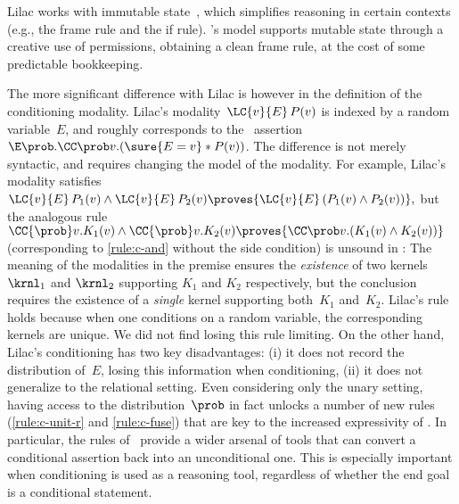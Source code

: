 \documentclass[acmsmall,nonacm,screen,appendix]{acmart}
\begin{document}
Lilac works with
immutable state~\cite{staton2020},
which simplifies reasoning in certain contexts
(e.g., the frame rule and the if rule).
\thelogic's model supports mutable state through a creative use of permissions,
obtaining a clean frame rule, at the cost of some predictable bookkeeping.

The more significant difference with Lilac is however in the definition of the conditioning modality.
Lilac's modality~$\LC{v}{E}\,P(v)$ is indexed by a random variable~$E$,
and roughly corresponds to the \thelogic\ assertion
$ \E \prob. \CC \prob v.(\sure{E=v} * P(v)) $.
The difference is not merely syntactic,
and requires changing the model of the modality.
For example, Lilac's modality satisfies
$
  {\LC{v}{E}\,P_1(v) \land \LC{v}{E}\,P_2(v)}
  \proves
  {\LC{v}{E}\,(P_1(v) \land P_2(v))},
$
but the analogous rule
$
  {\CC{\prob} v. K_1(v)
    \land
  \CC{\prob} v. K_2(v)}
  \proves
  {\CC\prob v.
    (K_1(v) \land K_2(v))}
$
(corresponding to \ref{rule:c-and} without the side condition)
is unsound in \thelogic:
The meaning of the modalities in the premise ensures
the \emph{existence} of two kernels $\krnl_1$ and $\krnl_2$ supporting
$K_1$ and $K_2$ respectively,
but the conclusion requires the existence of a \emph{single} kernel
supporting both~$K_1$ and~$K_2$.
Lilac's rule holds because when one conditions on a random variable,
the corresponding kernels are unique.
We did not find losing this rule limiting.
On the other hand,
Lilac's conditioning has two key disadvantages:
(i)  it does not record the distribution of~$E$,
     losing this information when conditioning,
(ii) it does not generalize to the relational setting.
Even considering only the unary setting,
having access to the distribution~$\prob$ in fact unlocks a number of new
rules (\eg \ref{rule:c-unit-r} and \ref{rule:c-fuse})
that are key to the increased expressivity of \thelogic.
In particular, the rules of \thelogic\ provide a wider arsenal of tools
that can convert a conditional assertion back into an unconditional one.
This is especially important when conditioning is used as a reasoning tool,
regardless of whether the end goal is a conditional statement.
\end{document}
